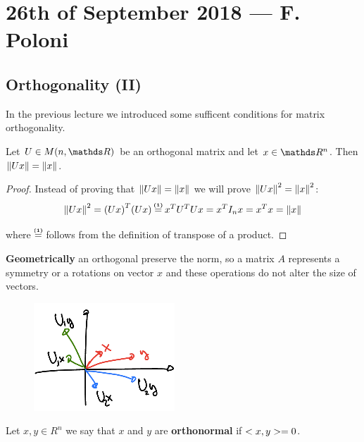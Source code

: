 \documentclass[ComputationalMathematics.tex]{subfiles}
\begin{document}
\section{26th of September 2018 --- F. Poloni}

\subsection{Orthogonality (II)}
In the previous lecture we introduced some sufficent conditions for matrix orthogonality.

\begin{theorem}
  Let $U \in M(n, \R)$ be an orthogonal matrix and let $x \in \R^n$. Then $\left\lVert Ux\right\rVert = \left\lVert x\right\rVert$.
\end{theorem}

\begin{proof}
  Instead of proving that $\left\lVert Ux\right\rVert = \left\lVert x\right\rVert$ we will prove $\left\lVert Ux\right\rVert^2 = \left\lVert x\right\rVert^2$:\\
  
  $$\norm{Ux}^2 = \tr{(Ux)} (Ux) \numeq{(1)} \tr{x} \tr{U} U x = \tr{x} I_n x = \tr{x} x = \norm{x}$$

  where $\numeq{(1)}$ follows from the definition of transpose of a product.
\end{proof}

\textbf{Geometrically} an orthogonal preserve the norm, so a matrix $A$ represents a symmetry or a rotations on vector $x$ and these operations do not alter the size of vectors.

\begin{figure}[H]
    \centering
    \includegraphics[scale = 0.5]{pics/26sett/orthgonal.png}
\end{figure}

\begin{definition}[Orthogonality]
  Let $x, y \in R^n$ we say that $x$ and $y$ are \textbf{orthonormal} if $<x, y> = 0$.
\end{definition}
\end{document}
